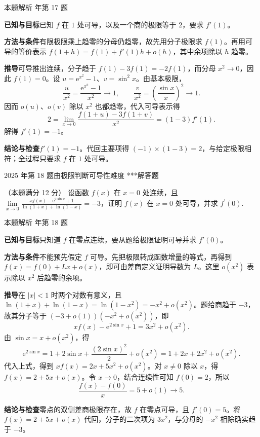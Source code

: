 \documentclass[UTF8,zihao=-4,fontset=fandol]{ctexart}
\renewcommand{\lim}{\operatorname*{lim}\limits}
\newcounter{BankQuestion}
\newcommand{\QuestionPage}[7]{%
  \stepcounter{BankQuestion}%
  \par\noindent\begin{minipage}{\linewidth}
  \raggedright
  {\small\textcolor{black!60}{#3\quad #5\quad 难度 #7}\hfill\textcolor{accent}{#2}}\par\smallskip}
\newcommand{\QuestionEnd}{\end{minipage}\par\medskip}
\newcommand{\QuestionPage}[7]{%
  \clearpage
  \stepcounter{BankQuestion}%
  {\small\textcolor{accent}{#1\hfill #2}}\par\medskip
  {\small\textcolor{black!60}{#3\quad #5\quad 难度 #7\hfill \arabic{BankQuestion} / 234}}\par\vspace{9bp}}
\newcommand{\QuestionEnd}{}
\newenvironment{QuestionSolution}[1]{%
  \clearpage
  {\small\textcolor{black!60}{本题解析\quad #1}}\par\medskip
}{\par\clearpage}
\begin{document}
\begin{QuestionSolution}{2022 年第 17 题}
\textbf{已知与目标}\quad 已知 \(f\) 在 \(1\) 处可导，以及一个商的极限等于 \(2\)，要求 \(f'(1)\)。

\textbf{方法与条件}\quad 有限极限乘上趋零的分母仍趋零，故先用分子极限求 \(f(1)\)。再用可导的等价表示 \(f(1+h)=f(1)+f'(1)h+o(h)\)，其中余项除以 \(h\) 趋零。

\textbf{推导}\quad 可导推出连续，分子趋于 \(f(1)-3f(1)=-2f(1)\)，而分母 \(x^2\to0\)，因此 \(f(1)=0\)。设 \(u=\mathrm{e}^{x^2}-1\)、\(v=\sin^2x\)。由基本极限，
\[
\frac{u}{x^2}=\frac{\mathrm e^{x^2}-1}{x^2}\to1,
\qquad \frac{v}{x^2}=\left(\frac{\sin x}{x}\right)^2\to1.
\]
因而 \(o(u)\)、\(o(v)\) 除以 \(x^2\) 也都趋零，代入可导表示得
\[
2=\lim_{x\to0}\frac{f(1+u)-3f(1+v)}{x^2}
=(1-3)f'(1).
\]
解得 \(f'(1)=-1\)。

\textbf{结论与检查}\quad \(\boxed{f'(1)=-1}\)。代回主要项得 \((-1)\times(1-3)=2\)，与给定极限相符；全过程只要求 \(f\) 在 \(1\) 处可导。
\end{QuestionSolution}

\QuestionPage{2.1 导数的概念}{解答题}{2025 年第 18 题}{3}{由极限判断可导性}{055 / 234}{***}
（本题满分 12 分）
设函数 \(f\left( x \right)\) 在 \(x = 0\) 处连续，且 \(\lim_{x \to 0} \frac{x f\left( x \right) - \mathrm{e}^{2 \sin x} + 1}{\ln \left( 1 + x \right) + \ln \left( 1 - x \right)} = -3\)，证明 \(f\left( x \right)\) 在 \(x = 0\) 处可导，并求 \(f^{\prime}\left( 0 \right)\).
\QuestionEnd

\begin{QuestionSolution}{2025 年第 18 题}
\textbf{已知与目标}\quad 只知道 \(f\) 在零点连续，要从题给极限证明可导并求 \(f'(0)\)。

\textbf{方法与条件}\quad 不能预先假定 \(f\) 可导。先把极限转成函数增量的等式，再得到 \(f(x)=f(0)+Lx+o(x)\)，即可由差商定义证明导数为 \(L\)。这里 \(o(x^2)\) 表示除以 \(x^2\) 后趋零的余项。

\textbf{推导}\quad 在 \(|x|<1\) 时两个对数有意义，且
\(\ln(1+x)+\ln(1-x)=\ln(1-x^2)=-x^2+o(x^2)\)。题给商趋于 \(-3\)，故其分子等于 \((-3+o(1))(-x^2+o(x^2))\)，即
\[
xf(x)-\mathrm{e}^{2\sin x}+1=3x^2+o(x^2).
\]
由 \(\sin x=x+o(x^2)\)，得
\[
\mathrm{e}^{2\sin x}=1+2\sin x+\frac{(2\sin x)^2}{2}+o(x^2)
=1+2x+2x^2+o(x^2).
\]
代入上式，得到 \(xf(x)=2x+5x^2+o(x^2)\)。对 \(x\ne0\) 除以 \(x\)，得 \(f(x)=2+5x+o(x)\)。令 \(x\to0\)，结合连续性可知 \(f(0)=2\)，所以
\[\frac{f(x)-f(0)}{x}=5+o(1)\to5.\]

\textbf{结论与检查}\quad 零点的双侧差商极限存在，故 \(f\) 在零点可导，且 \(\boxed{f'(0)=5}\)。将 \(f(x)=2+5x+o(x)\) 代回，分子的二次项为 \(3x^2\)，与分母的 \(-x^2\) 相除确实趋于 \(-3\)。
\end{QuestionSolution}
\end{document}

